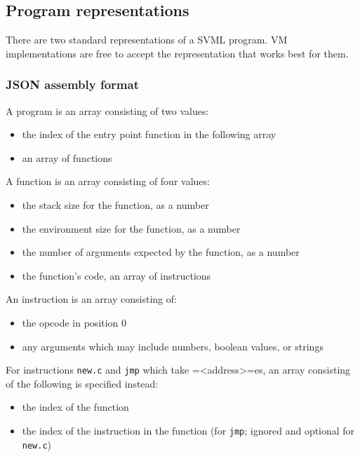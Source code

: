 \documentclass[11pt]{article}
\begin{document}
\subsection{Program representations}
\label{sec:org93986c5}
There are two standard representations of a SVML program. VM
implementations are free to accept the representation that works best
for them.

\subsubsection{JSON assembly format}
\label{sec:org5024ad9}
A program is an array consisting of two values:

\begin{itemize}
\item the index of the entry point function in the following array
\item an array of functions
\end{itemize}

A function is an array consisting of four values:

\begin{itemize}
\item the stack size for the function, as a number
\item the environment size for the function, as a number
\item the number of arguments expected by the function, as a number
\item the function's code, an array of instructions
\end{itemize}

An instruction is an array consisting of:

\begin{itemize}
\item the opcode in position 0
\item any arguments which may include numbers, boolean values, or strings
\end{itemize}

For instructions \texttt{new.c} and \texttt{jmp} which take =<address>=es, an array
consisting of the following is specified instead:

\begin{itemize}
\item the index of the function
\item the index of the instruction in the function (for \texttt{jmp}; ignored and
optional for \texttt{new.c})
\end{itemize}
\end{document}
